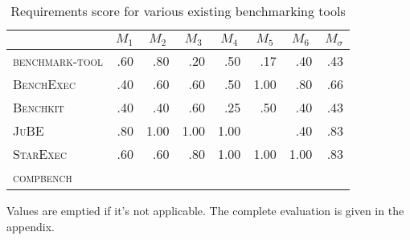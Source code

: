 \begin{table}
    \begin{threeparttable}
        \begin{adjustbox}{max width=\textwidth}
            \begin{tabular}{lddddddd}
                \toprule

                                              &  &  &  &  &  &  &  \\
                \midrule
                \textsc{benchmark-tool}       & .60                       & .80                       & .20                       & .50                       & .17                       & .40                       & .43                            \\
                \textsc{BenchExec}            & .40                       & .60                       & .60                       & .50                       & 1.00                      & .80                       & .66                            \\
                \textsc{Benchkit}             & .40                       & .40                       & .60                       & .25                       & .50                       & .40                       & .43                            \\
                \textsc{JuBE}                 & .80                       & 1.00                      & 1.00                      & 1.00                      &                           & .40                       & .83                            \\
                \textsc{StarExec}             & .60                       & .60                       & .80                       & 1.00                      & 1.00                      & 1.00                      & .83                            \\
                \textsc{compbench} \\ %
                \bottomrule
            \end{tabular}
        \end{adjustbox}
        \begin{tablenotes}
            \footnotesize
            \note Values are emptied if it's not applicable. The complete evaluation is given in the appendix.
        \end{tablenotes}
        \caption{Requirements score for various existing benchmarking tools}
        \label{tab:reqscoresummary}
    \end{threeparttable}
\end{table}

